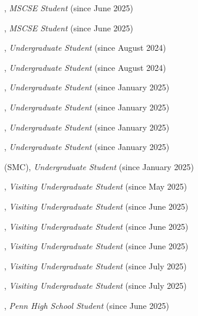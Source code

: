 \documentclass[10pt]{article}
\newenvironment{myindentpar}[1]%
{\begin{list}{}%
         {\setlength{\leftmargin}{#1}}%
         \item[]%
}
{\end{list}}
\newcounter{list}
\begin{document}
\begin{myindentpar}{0.75cm}
\hspace{-0.75cm}{\bf Brian Rabideau}, \textit{MSCSE Student} (since June 2025)

\hspace{-0.75cm}{\bf Cesar Cervera}, \textit{MSCSE Student} (since June 2025)

\hspace{-0.75cm}{\bf Lang Li}, \textit{Undergraduate Student} (since August 2024)

\hspace{-0.75cm}{\bf Olivia Zino}, \textit{Undergraduate Student} (since August 2024)

\hspace{-0.75cm}{\bf Thomas Mitchell}, \textit{Undergraduate Student} (since January 2025)

\hspace{-0.75cm}{\bf Zach Petko}, \textit{Undergraduate Student} (since January 2025)

\hspace{-0.75cm}{\bf Vince Andriacco}, \textit{Undergraduate Student} (since January 2025)

\hspace{-0.75cm}{\bf John Kim}, \textit{Undergraduate Student} (since January 2025)

\hspace{-0.75cm}{\bf Katherine O'Roark} (SMC), \textit{Undergraduate Student} (since January 2025)

\hspace{-0.75cm}{\bf Quang Dao}, \textit{Visiting Undergraduate Student} (since May 2025)

\hspace{-0.75cm}{\bf Beibei Liu}, \textit{Visiting Undergraduate Student} (since June 2025)

\hspace{-0.75cm}{\bf Han Yan}, \textit{Visiting Undergraduate Student} (since June 2025)

\hspace{-0.75cm}{\bf Tengchao Yang}, \textit{Visiting Undergraduate Student} (since June 2025)

\hspace{-0.75cm}{\bf Sichen Guo}, \textit{Visiting Undergraduate Student} (since July 2025)

\hspace{-0.75cm}{\bf Xuanjia Qiao}, \textit{Visiting Undergraduate Student} (since July 2025)

\hspace{-0.75cm}{\bf Kaiyi Zhao}, \textit{Penn High School Student} (since June 2025)

\end{myindentpar}
\end{document}
